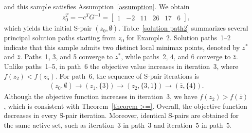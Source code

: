 \documentclass{article}
\begin{document}
	and this sample satisfies Assumption~\ref{assumption}. 
	We obtain
	\begin{align*}
	z_{0}^{T} = -c^{T}G^{-1} =
	\begin{bmatrix}
		1 & -2 & 11 & 26 & 17 & 6
	\end{bmatrix},
	\end{align*}
	which yields the initial S-pair $(z_{0}, \emptyset)$. 
	Table~\ref{solution path2} summarizes several principal solution paths starting from $z_{0}$ for Example~2. 
	Solution paths~1–2 indicate that this sample admits two distinct local minimax points, denoted by $z^{\ast}$ and $\bar{z}$. 
	Paths~1, 3, and 5 converge to $z^{\ast}$, while paths~2, 4, and 6 converge to $\bar{z}$. 
	Unlike paths~1–5, in path~6 the objective value increases in iteration~3, where $f(z_{2}) < f(z_{5})$. 
	For path~6, the sequence of S-pair iterations is
	\begin{align*}
	(z_{0}, \emptyset)
	\rightarrow (z_{1}, \{3\})
	\rightarrow (z_{2}, \{3, 1\})
	\rightarrow (\bar{z}, \{4\}).
	\end{align*}
	Although the objective function increases in iteration~3, we have $f(z_{2}) > f(\bar{z})$, which is consistent with Theorem~\ref{theorem >=}. 
	Overall, the objective function decreases in every S-pair iteration. 
	Moreover, identical S-pairs are obtained for the same active set, such as iteration~3 in path~3 and iteration~5 in path~5.
	
\end{document}
